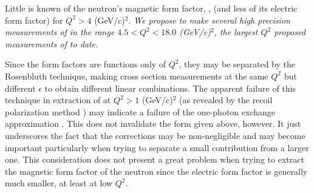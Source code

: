 \documentclass[12pt,letterpaper,oneside]{article}
\begin{document}
Little is known of the neutron's magnetic form factor, \gmnc, (and less of
its electric form factor) for $Q^2>4$ (GeV/c)$^2$.
{\it We propose to make several high precision measurements of  \gmn in the range
$4.5<Q^2<18.0$ (GeV/c)$^2$, the largest $Q^2$ proposed measurements of \gmn to date.}


Since the form factors are functions only of $Q^2$, they
may be separated by the Rosenbluth technique, making cross section 
measurements at
the same $Q^2$ but different $\epsilon$ to obtain different linear
combinations.  The apparent failure of this technique in extraction of \gep
at $Q^2>1$ (GeV/c)$^2$ (as revealed by the recoil polarization 
method \cite{jones,gayou})
may indicate a failure of the one-photon exchange approximation \cite{afan}.
This does not invalidate the form given above, however.  It just
underscores the fact that the corrections may be non-negligible and
may become important particularly when trying to separate a small contribution from
a larger one.  This consideration does not present a great problem
when trying to extract the magnetic form factor of the neutron since
the electric form factor is generally much smaller, at least at low $Q^2$.
\end{document}
